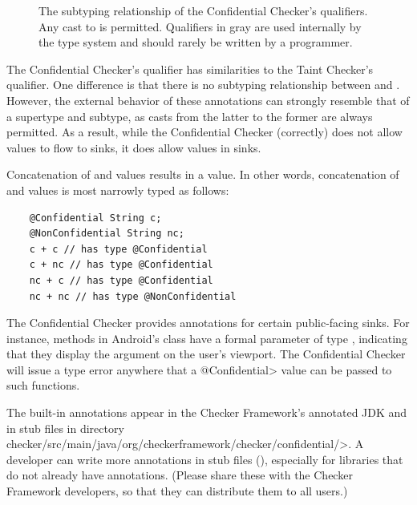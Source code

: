 \begin{figure}
\caption{The subtyping relationship of the Confidential Checker's qualifiers.
  Any cast to  is permitted.
  Qualifiers in gray are used internally by the type system and should rarely
  be written by a programmer.
}
\label{fig-confidential-hierarchy}
\end{figure}

The Confidential Checker's  qualifier has similarities
to the Taint Checker's  qualifier.  One difference is that
there is no subtyping relationship between  and
. However, the external behavior of these annotations
can strongly resemble that of a supertype and subtype, as casts from the
latter to the former are always permitted. As a result, while the
Confidential Checker (correctly) does not allow  values
to flow to  sinks, it does allow
 values in  sinks.


Concatenation of  and  values
results in a  value. In other words, concatenation of
 and  values is most narrowly typed
as follows:

\begin{Verbatim}
    @Confidential String c;
    @NonConfidential String nc;
    c + c // has type @Confidential
    c + nc // has type @Confidential
    nc + c // has type @Confidential
    nc + nc // has type @NonConfidential
\end{Verbatim}



The Confidential Checker provides annotations for certain public-facing
sinks.  For instance, methods in Android's  class have a
formal parameter of type , indicating
that they display the argument on the user's viewport.  The Confidential
Checker will issue a type error anywhere that a \<@Confidential> value can
be passed to such functions.

The built-in annotations appear in the Checker
Framework's annotated JDK and in stub files in directory
\<checker/\allowbreak src/\allowbreak main/\allowbreak java/\allowbreak org/\allowbreak checkerframework/\allowbreak checker/\allowbreak confidential/>.
A developer can write more annotations in stub files
(), especially for libraries that do not already have
annotations.  (Please share these with the Checker Framework developers, so
that they can distribute them to all users.)

